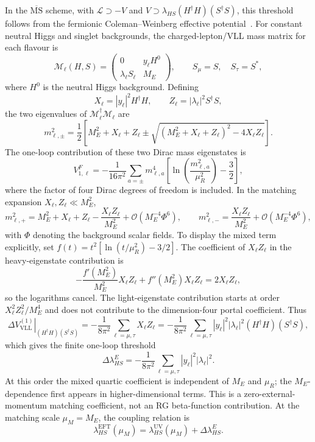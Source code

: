 \documentclass[12pt,a4paper]{article}
\begin{document}
In the \(\overline{\mathrm{MS}}\) scheme, with \(\mathcal L\supset -V\) and \(V\supset\lambda_{HS}(H^\dagger H)(S^\dagger S)\), this threshold follows from the fermionic Coleman--Weinberg effective potential~\cite{ColemanWeinberg:1973,Jackiw:1974}. For constant neutral Higgs and singlet backgrounds, the charged-lepton/VLL mass matrix for each flavour is
\[
\mathcal M_\ell(H,S)=
\begin{pmatrix}
0&y_\ell H^0\\
\lambda_\ell S_\ell&M_E
\end{pmatrix},
\qquad
S_\mu=S,\quad S_\tau=S^*,
\]
where \(H^0\) is the neutral Higgs background. Defining
\[
X_\ell=|y_\ell|^2H^\dagger H,\qquad
Z_\ell=|\lambda_\ell|^2S^\dagger S,
\]
the two eigenvalues of \(\mathcal M_\ell^\dagger\mathcal M_\ell\) are
\[
m_{\ell,\pm}^2
=\frac12\left[
M_E^2+X_\ell+Z_\ell
\pm\sqrt{(M_E^2+X_\ell+Z_\ell)^2-4X_\ell Z_\ell}
\right].
\]
The one-loop contribution of these two Dirac mass eigenstates is
\[
V_{1,\ell}^{F}
=-\frac{1}{16\pi^2}\sum_{a=\pm}
m_{\ell,a}^4
\left[
\ln\!\left(\frac{m_{\ell,a}^2}{\mu_R^2}\right)-\frac32
\right],
\]
where the factor of four Dirac degrees of freedom is included. In the matching expansion \(X_\ell,Z_\ell\ll M_E^2\),
\[
m_{\ell,+}^2
=M_E^2+X_\ell+Z_\ell-\frac{X_\ell Z_\ell}{M_E^2}
+\mathcal O(M_E^{-4}\Phi^6),
\qquad
m_{\ell,-}^2
=\frac{X_\ell Z_\ell}{M_E^2}
+\mathcal O(M_E^{-4}\Phi^6),
\]
with \(\Phi\) denoting the background scalar fields. To display the mixed term explicitly, set \(f(t)=t^2[\ln(t/\mu_R^2)-3/2]\). The coefficient of \(X_\ell Z_\ell\) in the heavy-eigenstate contribution is
\[
-\frac{f'(M_E^2)}{M_E^2}X_\ell Z_\ell
+f''(M_E^2)X_\ell Z_\ell
=2X_\ell Z_\ell,
\]
so the logarithms cancel. The light-eigenstate contribution starts at order \(X_\ell^2Z_\ell^2/M_E^4\) and does not contribute to the dimension-four portal coefficient. Thus
\[
\left.\Delta V_{\mathrm{VLL}}^{(1)}\right|_{(H^\dagger H)(S^\dagger S)}
=-\frac{1}{8\pi^2}\sum_{\ell=\mu,\tau}X_\ell Z_\ell
=-\frac{1}{8\pi^2}\sum_{\ell=\mu,\tau}
|y_\ell|^2|\lambda_\ell|^2
(H^\dagger H)(S^\dagger S),
\]
which gives the finite one-loop threshold
\[
\Delta\lambda_{HS}^{E}
=-\frac{1}{8\pi^2}\sum_{\ell=\mu,\tau}|y_\ell|^2|\lambda_\ell|^2.
\]
At this order the mixed quartic coefficient is independent of \(M_E\) and \(\mu_R\); the \(M_E\)-dependence first appears in higher-dimensional terms. This is a zero-external-momentum matching coefficient, not an RG beta-function contribution. At the matching scale \(\mu_M=M_E\), the coupling relation is
\[
\lambda_{HS}^{\mathrm{EFT}}(\mu_M)
=\lambda_{HS}^{\mathrm{UV}}(\mu_M)+\Delta\lambda_{HS}^{E}.
\]
\end{document}
